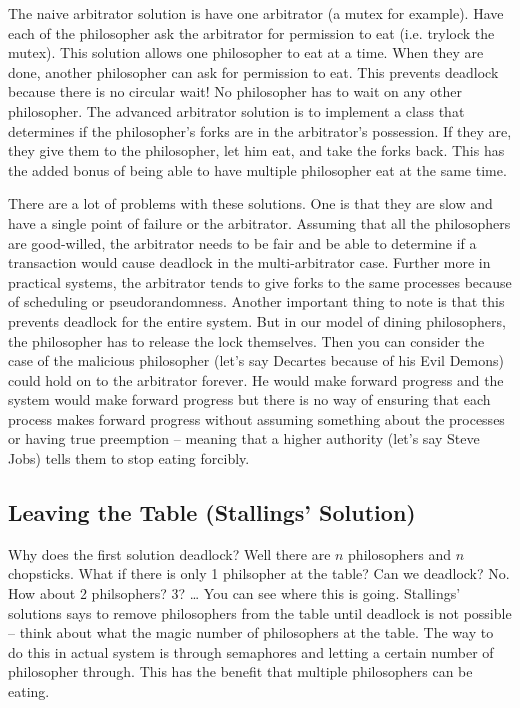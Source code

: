 The naive arbitrator solution is have one arbitrator (a mutex for example). Have each of the philosopher ask the arbitrator for permission to eat (i.e. trylock the mutex). This solution allows one philosopher to eat at a time. When they are done, another philosopher can ask for permission to eat. This prevents deadlock because there is no circular wait! No philosopher has to wait on any other philosopher. The advanced arbitrator solution is to implement a class that determines if the philosopher's forks are in the arbitrator's possession. If they are, they give them to the philosopher, let him eat, and take the forks back. This has the added bonus of being able to have multiple philosopher eat at the same time.

There are a lot of problems with these solutions. One is that they are slow and have a single point of failure or the arbitrator. Assuming that all the philosophers are good-willed, the arbitrator needs to be fair and be able to determine if a transaction would cause deadlock in the multi-arbitrator case. Further more in practical systems, the arbitrator tends to give forks to the same processes because of scheduling or pseudorandomness. Another important thing to note is that this prevents deadlock for the entire system. But in our model of dining philosophers, the philosopher has to release the lock themselves. Then you can consider the case of the malicious philosopher (let's say Decartes because of his Evil Demons) could hold on to the arbitrator forever. He would make forward progress and the system would make forward progress but there is no way of ensuring that each process makes forward progress without assuming something about the processes or having true preemption -- meaning that a higher authority (let's say Steve Jobs) tells them to stop eating forcibly.


\subsection{Leaving the Table (Stallings' Solution)}

Why does the first solution deadlock? Well there are $n$ philosophers and $n$ chopsticks. What if there is only 1 philsopher at the table? Can we deadlock? No. How about 2 philsophers? 3? \ldots{} You can see where this is going. Stallings' \cite[P. 280]{stalling} solutions says to remove philosophers from the table until deadlock is not possible -- think about what the magic number of philosophers at the table. The way to do this in actual system is through semaphores and letting a certain number of philosopher through. This has the benefit that multiple philosophers can be eating.

